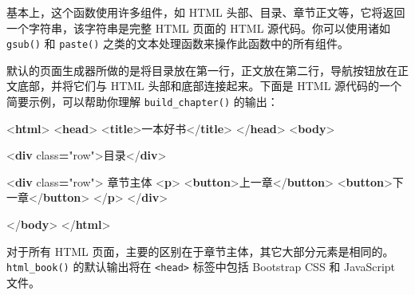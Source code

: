 \documentclass[
  12pt,
]{krantz}
\newenvironment{Shaded}{\begin{snugshade}}{\end{snugshade}}
\newcommand{\DataTypeTok}[1]{\textcolor[rgb]{0.13,0.29,0.53}{#1}}
\newcommand{\KeywordTok}[1]{\textcolor[rgb]{0.13,0.29,0.53}{\textbf{#1}}}
\newcommand{\NormalTok}[1]{#1}
\newcommand{\OperatorTok}[1]{\textcolor[rgb]{0.81,0.36,0.00}{\textbf{#1}}}
\newcommand{\OtherTok}[1]{\textcolor[rgb]{0.56,0.35,0.01}{#1}}
\newcommand{\StringTok}[1]{\textcolor[rgb]{0.31,0.60,0.02}{#1}}
\theoremstyle{definition}
\theoremstyle{definition}
\theoremstyle{definition}
\theoremstyle{definition}
\theoremstyle{remark}
\begin{document}
基本上，这个函数使用许多组件，如 HTML 头部、目录、章节正文等，它将返回一个字符串，该字符串是完整 HTML 页面的 HTML 源代码。你可以使用诸如 \texttt{gsub()} 和 \texttt{paste()} 之类的文本处理函数来操作此函数中的所有组件。

默认的页面生成器所做的是将目录放在第一行，正文放在第二行，导航按钮放在正文底部，并将它们与 HTML 头部和底部连接起来。下面是 HTML 源代码的一个简要示例，可以帮助你理解 \texttt{build\_chapter()} 的输出：

\begin{Shaded}
\begin{Highlighting}[]
\DataTypeTok{\textless{}}\KeywordTok{html}\DataTypeTok{\textgreater{}}
  \DataTypeTok{\textless{}}\KeywordTok{head}\DataTypeTok{\textgreater{}}
    \DataTypeTok{\textless{}}\KeywordTok{title}\DataTypeTok{\textgreater{}}\NormalTok{一本好书}\DataTypeTok{\textless{}/}\KeywordTok{title}\DataTypeTok{\textgreater{}}
  \DataTypeTok{\textless{}/}\KeywordTok{head}\DataTypeTok{\textgreater{}}
  \DataTypeTok{\textless{}}\KeywordTok{body}\DataTypeTok{\textgreater{}}
  
    \DataTypeTok{\textless{}}\KeywordTok{div}\OtherTok{ class}\OperatorTok{=}\StringTok{"row"}\DataTypeTok{\textgreater{}}\NormalTok{目录}\DataTypeTok{\textless{}/}\KeywordTok{div}\DataTypeTok{\textgreater{}}
    
    \DataTypeTok{\textless{}}\KeywordTok{div}\OtherTok{ class}\OperatorTok{=}\StringTok{"row"}\DataTypeTok{\textgreater{}}
\NormalTok{      章节主体}
      \DataTypeTok{\textless{}}\KeywordTok{p}\DataTypeTok{\textgreater{}}
        \DataTypeTok{\textless{}}\KeywordTok{button}\DataTypeTok{\textgreater{}}\NormalTok{上一章}\DataTypeTok{\textless{}/}\KeywordTok{button}\DataTypeTok{\textgreater{}}
        \DataTypeTok{\textless{}}\KeywordTok{button}\DataTypeTok{\textgreater{}}\NormalTok{下一章}\DataTypeTok{\textless{}/}\KeywordTok{button}\DataTypeTok{\textgreater{}}
      \DataTypeTok{\textless{}/}\KeywordTok{p}\DataTypeTok{\textgreater{}}
    \DataTypeTok{\textless{}/}\KeywordTok{div}\DataTypeTok{\textgreater{}}
  
  \DataTypeTok{\textless{}/}\KeywordTok{body}\DataTypeTok{\textgreater{}}
\DataTypeTok{\textless{}/}\KeywordTok{html}\DataTypeTok{\textgreater{}}
\end{Highlighting}
\end{Shaded}

对于所有 HTML 页面，主要的区别在于章节主体，其它大部分元素是相同的。\texttt{html\_book()} 的默认输出将在 \texttt{\textless{}head\textgreater{}} 标签中包括 Bootstrap CSS 和 JavaScript 文件。
\end{document}

